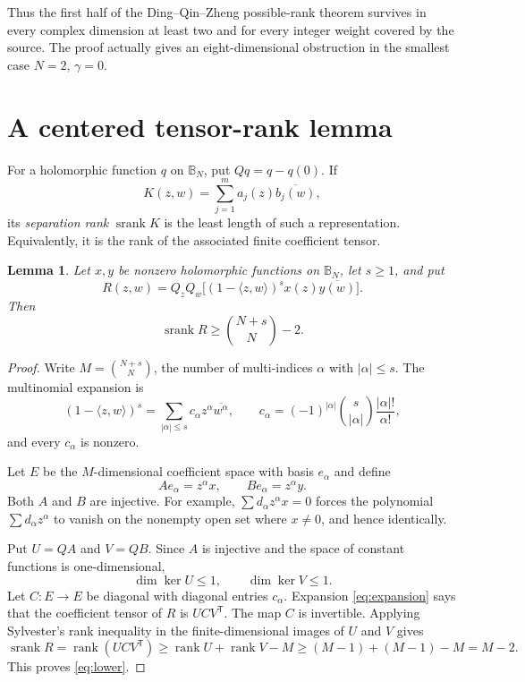 \documentclass[11pt]{article}
\newtheorem{lemma}[theorem]{Lemma}
\newcommand{\B}{\mathbb B}
\newcommand{\srank}{\operatorname{srank}}
\begin{document}
Thus the first half of the Ding--Qin--Zheng possible-rank theorem survives in
every complex dimension at least two and for every integer weight covered by
the source.  The proof actually gives an eight-dimensional obstruction in
the smallest case $N=2$, $\gamma=0$.

\section{A centered tensor-rank lemma}

For a holomorphic function $q$ on $\B_N$, put $Qq=q-q(0)$.  If
\[
 K(z,w)=\sum_{j=1}^m a_j(z)\overline{b_j(w)},
\]
its \emph{separation rank} $\srank K$ is the least length of such a
representation.  Equivalently, it is the rank of the associated finite
coefficient tensor.

\begin{lemma}\label{lem:rank}
Let $x,y$ be nonzero holomorphic functions on $\B_N$, let $s\ge1$, and put
\[
 R(z,w)=Q_zQ_w\bigl[
 (1-\langle z,w\rangle)^s x(z)\overline{y(w)}\bigr].
\]
Then
\begin{equation}\label{eq:lower}
 \srank R\ge \binom{N+s}{N}-2.
\end{equation}
\end{lemma}

\begin{proof}
Write $M=\binom{N+s}{N}$, the number of multi-indices $\alpha$ with
$|\alpha|\le s$.  The multinomial expansion is
\begin{equation}\label{eq:expansion}
 (1-\langle z,w\rangle)^s
 =\sum_{|\alpha|\le s}c_\alpha z^\alpha\overline{w^\alpha},
 \qquad
 c_\alpha=(-1)^{|\alpha|}\binom{s}{|\alpha|}
             \frac{|\alpha|!}{\alpha!},
\end{equation}
and every $c_\alpha$ is nonzero.

Let $E$ be the $M$-dimensional coefficient space with basis $e_\alpha$ and
define
\[
 A e_\alpha=z^\alpha x,\qquad B e_\alpha=z^\alpha y.
\]
Both $A$ and $B$ are injective.  For example,
$\sum d_\alpha z^\alpha x=0$ forces the polynomial
$\sum d_\alpha z^\alpha$ to vanish on the nonempty open set where $x\ne0$,
and hence identically.

Put $U=QA$ and $V=QB$.  Since $A$ is injective and the space of constant
functions is one-dimensional,
\begin{equation}\label{eq:kernels}
 \dim\ker U\le1,\qquad \dim\ker V\le1.
\end{equation}
Let $C:E\to E$ be diagonal with diagonal entries $c_\alpha$.  Expansion
\eqref{eq:expansion} says that the coefficient tensor of $R$ is $UCV^{\mathsf
T}$.  The map $C$ is invertible.  Applying Sylvester's rank inequality in
the finite-dimensional images of $U$ and $V$ gives
\[
 \srank R=\operatorname{rank}(UCV^{\mathsf T})
 \ge \operatorname{rank}U+\operatorname{rank}V-M
 \ge (M-1)+(M-1)-M=M-2.
\]
This proves \eqref{eq:lower}.
\end{proof}
\end{document}
